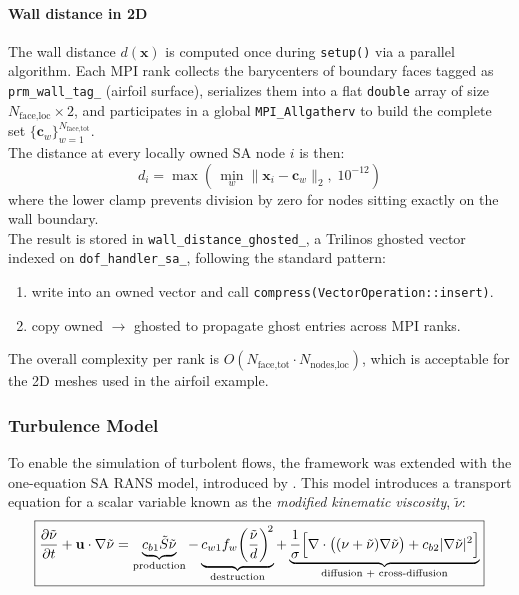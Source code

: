 \paragraph{Wall distance in 2D}


The wall distance $d(\mathbf{x})$ is computed once during \texttt{setup()} via a parallel algorithm. Each MPI rank collects the barycenters of boundary faces tagged as \texttt{prm\_wall\_tag\_} (airfoil surface), serializes them into a flat \texttt{double} array of size $N_\text{face,loc} \times 2$, and participates in a global \texttt{MPI\_Allgatherv} to build the complete set $\{\mathbf{c}_w\}_{w=1}^{N_\text{face,tot}}$.\\

The distance at every locally owned SA node $i$ is then:
\begin{equation}
  d_i = \max\!\left(\,\min_{w} \|\mathbf{x}_i - \mathbf{c}_w\|_2,\;
  10^{-12}\right)
\end{equation}
where the lower clamp prevents division by zero for nodes sitting exactly on the wall boundary.\\

The result is stored in \texttt{wall\_distance\_ghosted\_}, a Trilinos ghosted vector indexed on \texttt{dof\_handler\_sa\_}, following the standard pattern:
\begin{enumerate}
  \item write into an owned vector and call
        \texttt{compress(VectorOperation::insert)}.
  \item copy owned $\to$ ghosted to propagate ghost entries across MPI ranks.
\end{enumerate}
The overall complexity per rank is $O(N_\text{face,tot} \cdot N_\text{nodes,loc})$, which is acceptable for the 2D meshes used in the airfoil example.

\subsubsection{Turbulence Model}
\label{sec:02_turb_mod}

To enable the simulation of turbolent flows, the framework was extended with the one-equation SA RANS model, introduced by \cite{spalart1992}.
This model introduces a transport equation for a scalar variable known as the \emph{modified kinematic viscosity}, $\tilde{\nu}$:
\begin{equation}
\boxed{
  \frac{\partial \tilde{\nu}}{\partial t} + \mathbf{u} \cdot \nabla \tilde{\nu}
  =
  \underbrace{c_{b1}\tilde{S}\tilde{\nu}}_{\text{production}}
  -\underbrace{c_{w1}f_w\!\left(\frac{\tilde{\nu}}{d}\right)^{\!2}}_{\text{destruction}}
  +\underbrace{\frac{1}{\sigma}\Bigl[
     \nabla\cdot\bigl((\nu+\tilde{\nu})\nabla\tilde{\nu}\bigr)
     + c_{b2}|\nabla\tilde{\nu}|^2
   \Bigr]}_{\text{diffusion + cross-diffusion}}
}
\end{equation}

